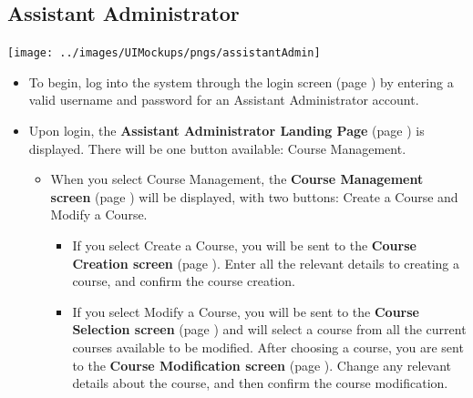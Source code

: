\documentclass{article}
\begin{document}
\subsection{Assistant Administrator}
\centerline{\texttt{[image: ../images/UIMockups/pngs/assistantAdmin]}}
\begin{itemize}
  \item To begin, log into the system through the login screen (page \pageref{login})
    by entering a valid username and password for an Assistant Administrator 
    account.
  \item Upon login, the \textbf{Assistant Administrator Landing Page} (page
    \pageref{landPg}) is displayed. There will be one button available: Course
    Management.
    \begin{itemize}
    \item When you select Course Management, the \textbf{Course Management
      screen} (page \pageref{courseManage}) will be displayed, with two buttons: 
      Create a Course and Modify a Course.
      \begin{itemize}
      \item If you select Create a Course, you will be sent to the \textbf{Course
	Creation screen} (page \pageref{createCourse}). Enter all the relevant details to creating a course, and
	confirm the course creation.
      \item If you select Modify a Course, you will be sent to the \textbf{Course
	Selection screen} (page \pageref{courseSel}) and will select a course from all the current courses
	available to be modified. After choosing a course, you are sent to the
	\textbf{Course Modification screen} (page \pageref{courseManage}). Change any relevant details about
	the course, and then confirm the course modification.
      \end{itemize}
    \end{itemize}
\end{itemize}
\end{document}
